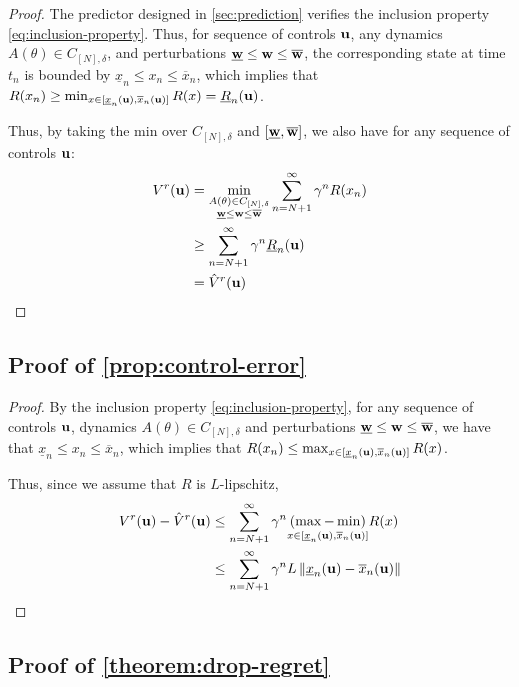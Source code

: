 \documentclass{article}
\begin{document}
\begin{proof}
	The predictor designed in \autoref{sec:prediction} verifies the inclusion property \eqref{eq:inclusion-property}. Thus, for sequence of controls $\mathbf{u}$, any dynamics $A(\theta)\in C_{[N],\delta}$, and perturbations $\underline{\mathbf{w}} \leq \mathbf{w} \leq \overline{\mathbf{w}}$, the corresponding state at time $t_n$ is bounded by $\underline{x}_n \leq x_n \leq \overline{x}_n$, which implies that $R(x_n) \geq \min_{x\in[\underline{x}_n(\mathbf{u}), \overline{x}_n(\mathbf{u})]}  R(x) = \underline{R}_n(\mathbf{u})$.
	
	Thus, by taking the min over $C_{[N],\delta}$ and $[\underline{\mathbf{w}}, \overline{\mathbf{w}}]$, we also have for any sequence of controls $\mathbf{u}$:
	\begin{align*}
	    V^r(\mathbf{u}) &= \min_{\substack{A(\theta)\in C_{[N],\delta}\\ \underline{\mathbf{w}} \leq \mathbf{w} \leq \overline{\mathbf{w}}}} \sum_{n=N+1}^\infty \gamma^n R(x_n)\\
	    &\geq \sum_{n=N+1}^\infty \gamma^n \underline{R}_n(\mathbf{u})\\
	    &= \hat{V}^r(\mathbf{u})
	\end{align*}
\end{proof}

\subsection{Proof of \autoref{prop:control-error}}

\begin{proof}
 By the inclusion property \eqref{eq:inclusion-property}, for any sequence of controls $\mathbf{u}$, dynamics $A(\theta)\in C_{[N],\delta}$ and perturbations $\underline{\mathbf{w}} \leq \mathbf{w} \leq \overline{\mathbf{w}}$, we have that $\underline{x}_n \leq x_n \leq \overline{x}_n$, which implies that $R(x_n) \leq \max_{x\in[\underline{x}_n(\mathbf{u}), \overline{x}_n(\mathbf{u})]}  R(x)$.
 
 Thus, since we assume that $R$ is $L$-lipschitz,
 \begin{align}
     V^r(\mathbf{u}) - \hat{V}^r(\mathbf{u}) &\leq \sum_{n=N+1}^\infty \gamma^n \underset{{x\in[\underline{x}_n(\mathbf{u}), \overline{x}_n(\mathbf{u})]}}{(\max - \min)} R(x)\\
     &\leq \sum_{n=N+1}^\infty \gamma^n L \left\|\underline{x}_n(\mathbf{u}) - \overline{x}_n(\mathbf{u})\right\|
 \end{align}

\end{proof}


\subsection{Proof of \autoref{theorem:drop-regret}}
\end{document}
